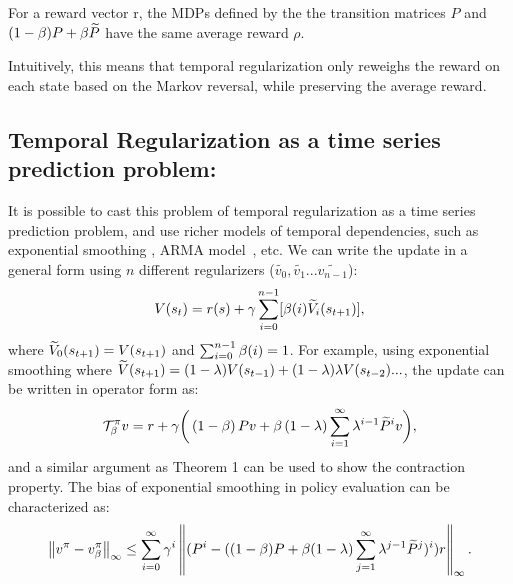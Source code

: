 \begin{proposition}
For a reward vector r, the MDPs defined by the the transition matrices $P$ and $(1-\beta) P + \beta \widetilde{P}$ have the same average reward $\rho$.
\end{proposition}
Intuitively, this means that temporal regularization only reweighs the reward on each state based on the Markov reversal, while preserving the average reward.

\subsection{Temporal Regularization as a time series prediction problem:}
It is possible to cast this problem of temporal regularization as a time series prediction problem, and use richer models of temporal dependencies, such as exponential smoothing \cite{gardner2006exponential}, ARMA model~\cite{box94}, etc. We can write the update in a general form using $n$ different regularizers ($\widetilde{v_0},\widetilde{v_1}...\widetilde{v_{n-1}}$):
\begin{equation}
    V(s_t) = r(s) + \gamma \sum_{i=0}^{n-1} [\beta(i) \widetilde{V}_i(s_{t+1})],
\end{equation}
where $\widetilde{V}_0(s_{t+1}) = V(s_{t+1})$ and $\sum_{i=0}^{n-1} \beta(i) = 1$. For example, using exponential smoothing where $\widetilde{V}(s_{t+1}) = (1-\lambda) V(s_{t-1}) + (1-\lambda)\lambda V(s_{t-2})...$, the update can be written in operator form as:
\begin{equation}
    \label{eq:exp_smooth}
    \mathcal{T}^{\pi}_{\beta} v = r + \gamma \bigg(\left(1-\beta\right) Pv + \beta \left(1-\lambda\right) \sum_{i=1}^{\infty} \lambda^{i-1} \widetilde{P}^i v\bigg),
\end{equation}
and a similar argument as Theorem 1 can be used to show the contraction property. The bias of exponential smoothing in policy evaluation can be characterized as:
\begin{equation}
        \left\lVert v^{\pi} - v^{\pi}_{\beta}\right\rVert_{\infty} \leq  \sum_{i=0}^{\infty} \gamma^i \left\lVert (P^i-((1-\beta) P + \beta (1-\lambda) \sum_{j=1}^{\infty} \lambda^{j-1} \widetilde{P}^j)^i) r\right\rVert_{\infty}.
\end{equation}

